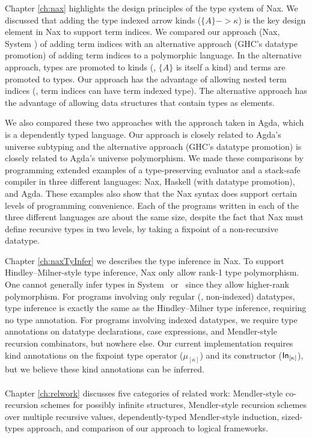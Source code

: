 Chapter \ref{ch:nax} highlights the design principles of the type system of Nax.
We discussed that adding the type indexed arrow kinds ($\{A\} -> \kappa$) is
the key design element in Nax to support term indices.
We compared our approach (Nax, System \Fi) of adding term indices with
an alternative approach (GHC's datatype promotion) of adding
term indices to a polymorphic language. In the alternative approach,
types are promoted to kinds (\ie, $\{A\}$ is itself a kind) and
terms are promoted to types. Our approach has the advantage of
allowing nested term indices (\ie, term indices can have term indexed type).
The alternative approach has the advantage of allowing data structures that
contain types as elements.

We also compared these two approaches with the approach taken in Agda, which
is a dependently typed language. Our approach is closely related to
Agda's universe subtyping and the alternative approach
(GHC's datatype promotion) is closely related to
Agda's universe polymorphism. We made these comparisons by programming extended
examples of a type-preserving evaluator and a stack-safe compiler
in three different languages: Nax, Haskell (with datatype promotion), and Agda.
These examples also show that the Nax syntax does support certain levels of
programming convenience. Each of the programs written in each of the three different
languages are about the same size, despite the fact that Nax must define
recursive types in two levels, by taking a fixpoint of a non-recursive datatype.

Chapter \ref{ch:naxTyInfer} we describes the type inference in Nax.
To support Hindley--Milner-style type inference, Nax only
allow rank-1 type polymorphism. One cannot generally infer types
in System \Fi\ or \Fixi\ since they allow higher-rank polymorphism.
For programs involving only regular (\ie, non-indexed) datatypes,
type inference is exactly the same as the Hindley--Milner type inference,
requiring no type annotation. For programs involving indexed datatypes,
we require type annotations on datatype declarations, case expressions, and
Mendler-style recursion combinators, but nowhere else.
Our current implementation requires kind annotations on
the fixpoint type operator ($\mu_{[\kappa]}$) and its constructor
($\mathsf{In}_{[\kappa]}$), but we believe these kind annotations can be inferred.

\paragraph{}
Chapter \ref{ch:relwork} discusses five categories of related work:
Mendler-style co-recursion schemes for possibly infinite structures,
Mendler-style recursion schemes over multiple recursive values,
dependently-typed Mendler-style induction, sized-types approach,
and comparison of our approach to logical frameworks.

